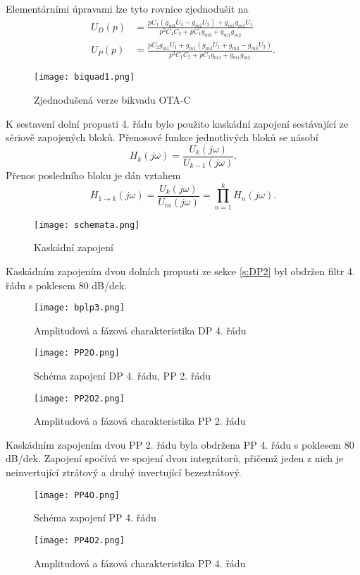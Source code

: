 \noindent Elementárními úpravami lze tyto rovnice zjednodušit na
\begin{align}
U_D(p) &= \frac{pC_1(g_{m3}U_3 - g_{m2}U_2) + g_{m1}g_{m2}U_1}{p^2C_1C_2 + pC_1g_{m3} + g_{m1}g_{m2}}\\
U_P(p) &= \frac{pC_2g_{m1}U_1 + g_{m1}(g_{m3}U_1 + g_{m2} - g_{m3}U_3)}{p^2C_1C_2 + pC_1g_{m3} + g_{m1}g_{m2}}.
\end{align}
\noindent
\begin{figure}[h]
\centering
\texttt{[image: biquad1.png]}
\caption[Zjednodušená verze bikvadu OTA-C]{Zjednodušená verze bikvadu OTA-C \cite{7} \label{s:BIK2}}
\end{figure}
\noindent K sestavení dolní propusti 4. řádu bylo použito kaskádní zapojení sestávající ze sériově zapojených bloků. Přenosové funkce jednotlivých bloků se násobí
\begin{equation}
H_k(j\omega) = \frac{U_k (j\omega)}{U_{k-1}(j\omega)}.
\end{equation}
Přenos posledního bloku je dán vztahem
\begin{equation}
H_{1 \rightarrow k}(j\omega) = \frac{U_k (j\omega)}{U_{in}(j\omega)} = \prod _{n=1}^{k} H_n(j\omega).
\end{equation}
\begin{figure}[h]
\centering
\texttt{[image: schemata.png]}
\caption[Kaskádní zapojení]{Kaskádní zapojení \cite{9}}
\end{figure}
Kaskádním zapojením dvou dolních propusti ze sekce \ref{s:DP2} byl obdržen filtr 4. řádu s poklesem 80 dB/dek.
\begin{figure}[h]
\centering
\texttt{[image: bplp3.png]}
\caption{Amplitudová a fázová charakteristika DP 4. řádu}
\end{figure}
\begin{figure}[h]
\centering
\texttt{[image: PP2O.png]}
\caption{Schéma zapojení DP 4. řádu, PP 2. řádu}
\end{figure}
\begin{figure}[h]
\centering
\texttt{[image: PP2O2.png]}
\caption{Amplitudová a fázová charakteristika PP 2. řádu}
\end{figure}
\noindent Kaskádním zapojením dvou PP 2. řádu byla obdržena PP 4. řádu s poklesem 80 dB/dek. Zapojení spočívá ve spojení dvou integrátorů, přičemž jeden z nich je neinvertující ztrátový a druhý invertující bezeztrátový.
\begin{figure}[h]
\centering
\texttt{[image: PP4O.png]}
\caption{Schéma zapojení PP 4. řádu}
\end{figure}
\begin{figure}[h]
\centering
\texttt{[image: PP4O2.png]}
\caption{Amplitudová a fázová charakteristika PP 4. řádu}
\end{figure}